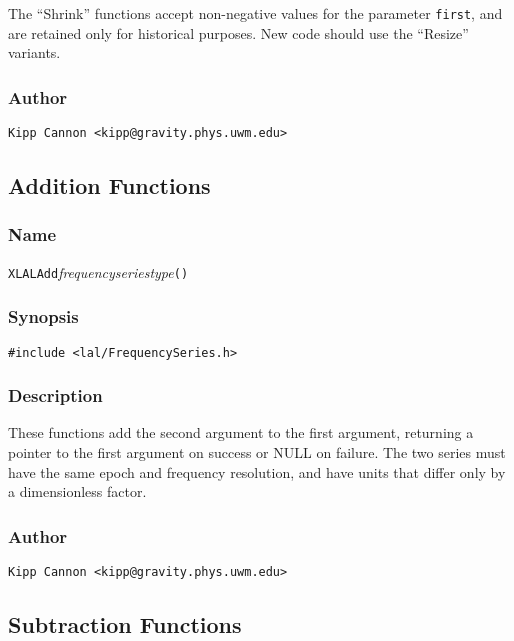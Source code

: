The ``Shrink'' functions accept non-negative values for the parameter
\texttt{first}, and are retained only for historical purposes.  New code
should use the ``Resize'' variants.

\subsubsection{Author}

\verb|Kipp Cannon <kipp@gravity.phys.uwm.edu>|


\subsection{Addition Functions}

\subsubsection{Name}

\texttt{XLALAdd}\textit{frequencyseriestype}\texttt{()}

\subsubsection{Synopsis}

\begin{verbatim}
#include <lal/FrequencySeries.h>
\end{verbatim}


\subsubsection{Description}

These functions add the second argument to the first argument, returning a
pointer to the first argument on success or NULL on failure.  The two
series must have the same epoch and frequency resolution, and have units
that differ only by a dimensionless factor.

\subsubsection{Author}

\verb|Kipp Cannon <kipp@gravity.phys.uwm.edu>|


\subsection{Subtraction Functions}

